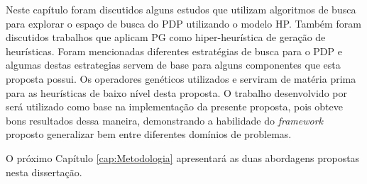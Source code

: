 Neste capítulo foram discutidos alguns estudos que utilizam algoritmos de busca para explorar o espaço de busca do PDP utilizando o modelo HP. Também foram discutidos trabalhos que aplicam PG como hiper-heurística de geração de heurísticas. Foram mencionadas diferentes estratégias de busca para o PDP e algumas destas estrategias servem de base para alguns componentes que esta proposta possui. Os operadores genéticos utilizados \cite{custodio2014multiple} e \cite{lin2011protein} serviram de matéria prima para as heurísticas de baixo nível desta proposta. O trabalho desenvolvido por \cite{sabar2015automatic} será utilizado como base na implementação da presente proposta, pois obteve bons resultados dessa maneira, demonstrando a habilidade do \textit{framework} proposto generalizar bem entre diferentes domínios de problemas.

O próximo Capítulo \ref{cap:Metodologia} apresentará as duas abordagens propostas nesta dissertação. 